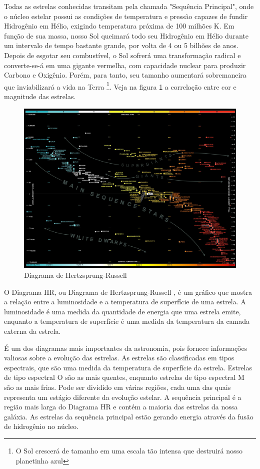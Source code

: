 \documentclass[a4paper,12pt]{book}
\begin{document}
Todas as estrelas conhecidas transitam pela chamada "Sequência Principal", onde o núcleo estelar possui as condições de temperatura e pressão capazes de fundir Hidrogênio em Hélio, exigindo temperatura próxima de 100 milhões K. Em função de sua massa, nosso Sol queimará todo seu Hidrogênio em Hélio durante um intervalo de tempo bastante grande, por volta de 4 ou 5 bilhões de anos. Depois de esgotar seu combustível, o Sol sofrerá uma transformação radical e converte-se-á em uma gigante vermelha, com capacidade nuclear para produzir Carbono e Oxigênio. Porém, para tanto, seu tamanho aumentará sobremaneira que inviabilizará a vida na Terra \footnote{O Sol crescerá de tamanho em uma escala tão intensa que destruirá nosso planetinha azul}. Veja na figura \ref{fig:HR} a correlação entre cor e magnitude das estrelas.

\begin{figure}[h]
	\centering
	\caption{Diagrama de Hertzsprung-Russell}
	\vspace{0.25cm}
	\label{fig:HR}
	\includegraphics[width=1\linewidth]{imagens/diagrama-hr-completo.jpg}
\end{figure}

O Diagrama HR, ou Diagrama de Hertzsprung-Russell \cite{HR}, é um gráfico que mostra a relação entre a luminosidade e a temperatura de superfície de uma estrela. A luminosidade é uma medida da quantidade de energia que uma estrela emite, enquanto a temperatura de superfície é uma medida da temperatura da camada externa da estrela.

É um dos diagramas mais importantes da astronomia, pois fornece informações valiosas sobre a evolução das estrelas. As estrelas são classificadas em tipos espectrais, que são uma medida da temperatura de superfície da estrela. Estrelas de tipo espectral O são as mais quentes, enquanto estrelas de tipo espectral M são as mais frias. Pode ser dividido em várias regiões, cada uma das quais representa um estágio diferente da evolução estelar. A sequência principal é a região mais larga do Diagrama HR e contém a maioria das estrelas da nossa galáxia. As estrelas da sequência principal estão gerando energia através da fusão de hidrogênio no núcleo.
\end{document}
